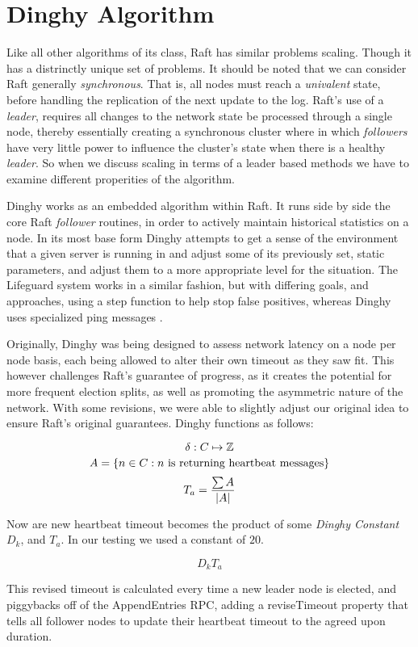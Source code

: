 \section{Dinghy Algorithm}

Like all other algorithms of its class, Raft has similar problems scaling. Though it has a distrinctly unique set of problems. It should be noted that we can consider Raft generally \textit{synchronous}. That is, all nodes must reach a \textit{univalent} state, before handling the replication of the next update to the log. Raft's use of a \textit{leader}, requires all changes to the network state be processed through a single node, thereby essentially creating a synchronous cluster where in which \textit{followers} have very little power to influence the cluster's state when there is a healthy \textit{leader}. So when we discuss scaling in terms of a leader based methods we have to examine different properities of the algorithm.

Dinghy works as an embedded algorithm within Raft. It runs side by side the core Raft \textit{follower} routines, in order to actively maintain historical statistics on a node. In its most base form Dinghy attempts to get a sense of the environment that a given server is running in and adjust some of its previously set, static parameters, and adjust them to a more appropriate level for the situation. The Lifeguard system works in a similar fashion, but with differing goals, and approaches, using a step function to help stop false positives, whereas Dinghy uses specialized ping messages \cite{Lifeguard}.

Originally, Dinghy was being designed to assess network latency on a node per node basis, each being allowed to alter their own timeout as they saw fit. This however challenges Raft's guarantee of progress, as it creates the potential for more frequent election splits, as well as promoting the asymmetric nature of the network. With some revisions, we were able to slightly adjust our original idea to ensure Raft's original guarantees. Dinghy functions as follows:

\[\delta: C \mapsto \mathbb{Z}\\\]
\[A=\{n \in C: n \text{ is returning heartbeat messages}\}\\\]
\[T_{a}=\frac{\sum A}{\left|A\right|}\\\]

Now are new heartbeat timeout becomes the product of some \textit{Dinghy Constant} $D_{k}$, and $T_{a}$. In our testing we used a constant of $20$.

\[D_{k}T_{a}\]

This revised timeout is calculated every time a new leader node is elected, and piggybacks off of the AppendEntries RPC, adding a reviseTimeout property that tells all follower nodes to update their heartbeat timeout to the agreed upon duration.
